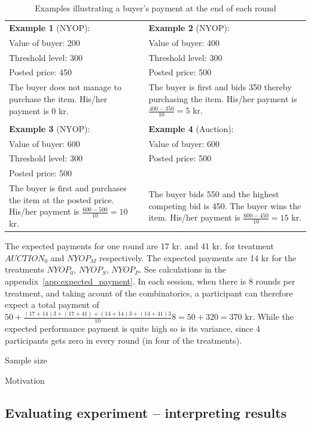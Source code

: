 \documentclass[a4paper,12pt]{article}
\begin{document}
	\begin{table}[ht]
		\caption{Examples illustrating a buyer's payment at the end of each round}
		\begin{tabular}{p{}  p{}}
			{\bf Example 1} (NYOP): 	& {\bf Example 2} (NYOP):  		\\
			Value of buyer: 200 		& Value of buyer: 400 			\\
			Threshold level: 300 		& Threshold level: 300 			\\
			Posted price: 450 			& Posted price: 500 			\\
			The buyer does not manage to purchase the item. His/her payment is 0 kr. & The buyer is first and bids 350 thereby purchasing the item. His/her payment is $\frac{400-350}{10}=5$ kr. \\
			\multicolumn{2}{c}{} \\
			{\bf Example 3} (NYOP):  	& {\bf Example 4} (Auction): 	\\
			Value of buyer: 600 		& Value of buyer: 600  			\\
			Threshold level: 300  		& Posted price: 500  			\\
			Posted price: 500  			&  								\\
			The buyer is first and purchases the item at the posted price. His/her payment is $\frac{600-500}{10}=10$ kr. & The buyer bids 550 and the highest competing bid is 450. The buyer wins the item. His/her payment is $\frac{600-450}{10}=15$ kr. \\
		\end{tabular}
		\label{tab:payment}
	\end{table}
	
	The expected payments for one round are 17 kr. and 41 kr. for treatment $AUCTION_0$ and $NYOP_M$ respectively. The expected payments are 14 kr for the treatments $NYOP_0$, $NYOP_S$, $NYOP_P$. See calculations in the appendix~\ref{app:expected_payment}. In each session, when there is 8 rounds per treatment, and taking acount of the combinatorics, a participant can therefore expect a total payment of $50 + \frac{(17+14)3 + (17+41) + (14+14)3 + (14+41)3}{10}8 = 50 + 320 = 370$ kr. While the expected performance payment is quite high so is its variance, since 4 participants gets zero in every round (in four of the treatments).

	Sample size
	
	Motivation

	\subsection{Evaluating experiment -- interpreting results}
	
\end{document}
